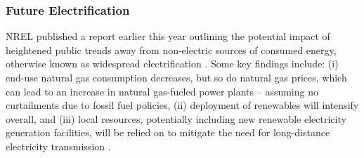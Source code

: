 \subsubsection{Future Electrification}\label{ch4:electrification_uncertainty}
NREL published a report earlier this year outlining the potential impact of heightened public trends away from non-electric sources of consumed energy, otherwise known as widespread electrification \citep{murphy_electrification_2021}. Some key findings include: (i) end-use natural gas consumption decreases, but so do natural gas prices, which can lead to an increase in natural gas-fueled power plants -- assuming no curtailments due to fossil fuel policies, (ii) deployment of renewables will intensify overall, and (iii) local resources, potentially including new renewable electricity generation facilities, will be relied on to mitigate the need for long-distance electricity transmission \citep{murphy_electrification_2021}.

